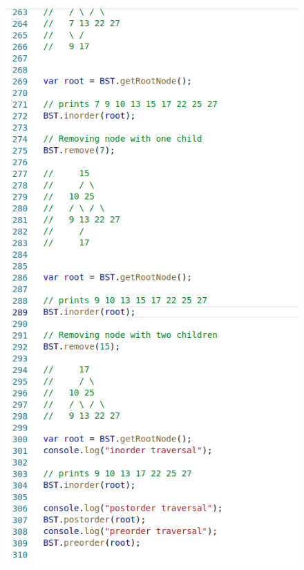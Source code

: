     \begin{figure}[H]
    	\centering
    	\includegraphics[width=0.9\linewidth]{Pictures/BST_Code3}
    	\caption{}
    	\label{fig:bstcode3}
    \end{figure}
